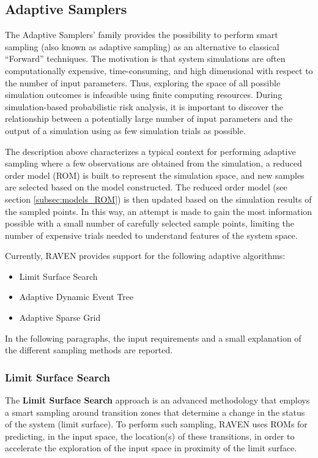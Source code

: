 \subsection{Adaptive Samplers}
\label{subsec:AdaptSamplers}
The Adaptive Samplers' family provides the possibility to perform smart sampling
(also known as adaptive sampling) as an alternative to classical “Forward”
techniques.
%
The motivation is that system simulations are often computationally expensive,
time-consuming, and high dimensional with respect to the number of input
parameters.
%
Thus, exploring the space of all possible simulation outcomes is infeasible
using finite computing resources.
%
During simulation-based probabilistic risk analysis, it is important to discover
the relationship between a potentially large number of input parameters and the
output of a simulation using as few simulation trials as possible.

The description above characterizes a typical context for performing adaptive
sampling where a few observations are obtained from the simulation, a reduced
order model (ROM) is built to represent the simulation space, and new samples
are selected based on the model constructed.
%
The reduced order model (see section \ref{subsec:models_ROM}) is then updated
based on the simulation results of the sampled points.
%
In this way, an attempt is made to gain the most information possible with a
small number of carefully selected sample points, limiting the number of
expensive trials needed to understand features of the system space.
%

Currently, RAVEN provides support for the following adaptive algorithms:

\begin{itemize}
  \item Limit Surface Search
  \item Adaptive Dynamic Event Tree
  \item Adaptive Sparse Grid
\end{itemize}

In the following paragraphs, the input requirements and a small explanation of
the different sampling methods are reported.

\subsubsection{Limit Surface Search}
\label{subsubsubsec:LimitSurfaceSearch}
The \textbf{Limit Surface Search} approach is an advanced methodology that employs
a smart sampling around transition zones that determine a change in the status
of the system (limit surface).
%
To perform such sampling, RAVEN uses ROMs for predicting, in the input space,
the location(s) of these transitions, in order to accelerate the exploration of
the input space in proximity of the limit surface.
%

